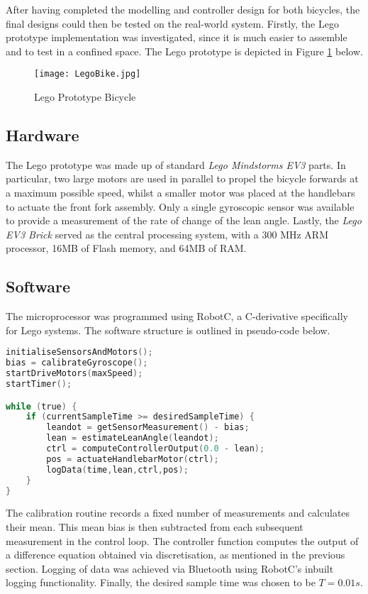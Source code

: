 After having completed the modelling and controller design for both bicycles, the final designs could then be tested on the real-world system. Firstly, the Lego prototype implementation was investigated, since it is much easier to assemble and to test in a confined space. The Lego prototype is depicted in Figure \ref{fig:lego} below.

\begin{figure}[H]
\centering
\texttt{[image: LegoBike.jpg]}
\caption{Lego Prototype Bicycle}
\label{fig:lego}
\end{figure}

\subsection{Hardware}
The Lego prototype was made up of standard \textit{Lego Mindstorms EV3} parts. In particular, two large motors are used in parallel to propel the bicycle forwards at a maximum possible speed, whilst a smaller motor was placed at the handlebars to actuate the front fork assembly. Only a single gyroscopic sensor was available to provide a measurement of the rate of change of the lean angle. Lastly, the \textit{Lego EV3 Brick} served as the central processing system, with a 300 MHz ARM processor, 16MB of Flash memory, and 64MB of RAM.

\subsection{Software}
The microprocessor was programmed using RobotC, a C-derivative specifically for Lego systems. The software structure is outlined in pseudo-code below.

\begin{lstlisting}[language=C, caption=Lego Software Pseudo-Code]
initialiseSensorsAndMotors();
bias = calibrateGyroscope();
startDriveMotors(maxSpeed);
startTimer();

while (true) {
	if (currentSampleTime >= desiredSampleTime) {
		leandot = getSensorMeasurement() - bias;
		lean = estimateLeanAngle(leandot);
		ctrl = computeControllerOutput(0.0 - lean);
		pos = actuateHandlebarMotor(ctrl);
		logData(time,lean,ctrl,pos);
	}
}
\end{lstlisting}

The calibration routine records a fixed number of measurements and calculates their mean. This mean bias is then subtracted from each subsequent measurement in the control loop. The controller function computes the output of a difference equation obtained via discretisation, as mentioned in the previous section. Logging of data was achieved via Bluetooth using RobotC's inbuilt logging functionality. Finally, the desired sample time was chosen to be $T=0.01s$.

